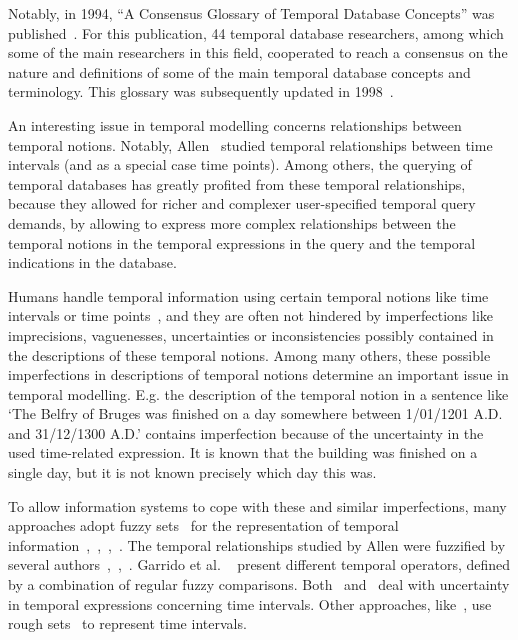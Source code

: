 Notably, in 1994, ``A Consensus Glossary of Temporal Database Concepts'' was published~\cite{Dyreson1994}. For this publication, 44 temporal database researchers, among which some of the main researchers in this field, cooperated to reach a consensus on the nature and definitions of some of the main temporal database concepts and terminology. This glossary was subsequently updated in 1998~\cite{Jensen:Dyreson:1998:TheConsensusGlossary}.

An interesting issue in temporal modelling concerns relationships between temporal notions. Notably, Allen~\cite{Allen83} studied temporal relationships between time intervals (and as a special case time points). Among others, the querying of temporal databases has greatly profited from these temporal relationships, because they allowed for richer and complexer user-specified temporal query demands, by allowing to express more complex relationships between the temporal notions in the temporal expressions in the query and the temporal indications in the database.

Humans handle temporal information using certain temporal notions like time intervals or time points~\cite{Dyreson1994}, and they are often not hindered by imperfections like imprecisions, vaguenesses, uncertainties or inconsistencies possibly contained in the descriptions of these temporal notions. Among many others, these possible imperfections in descriptions of temporal notions determine an important issue in temporal modelling. E.g. the description of the temporal notion in a sentence like `The Belfry of Bruges was finished on a day somewhere between 1/01/1201 A.D. and 31/12/1300 A.D.' contains imperfection because of the uncertainty in the used time-related expression. It is known that the building was finished on a single day, but it is not known precisely which day this was.

To allow information systems to cope with these and similar imperfections, many approaches adopt fuzzy sets~\cite{Zadeh65} for the representation of temporal information~\cite{343607},~\cite{nagypal2003},~\cite{Billiet:Pons:Matthe:DeTre:Pons:2011:BipolarFuzzy},~\cite{Dubois:jucs_9_9:fuzziness_and_uncertainty_in}. The temporal relationships studied by Allen were fuzzified by several authors~\cite{ohlbach2004},~\cite{nagypal2003},~\cite{schockaert08}. Garrido et al. ~\cite{garrido2009} present different temporal operators, defined by a combination of regular fuzzy comparisons. Both~\cite{garrido2009} and~\cite{Pon11} deal with uncertainty in temporal expressions concerning time intervals. Other approaches, like~\cite{Qia09}, use rough sets~\cite{Pawlak1995} to represent time intervals.

